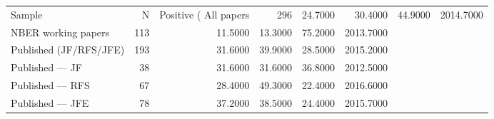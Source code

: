 \begin{tabular}{lrrrrr}
\toprule
Sample & N & Positive (%
\midrule
All papers & 296 & 24.7000 & 30.4000 & 44.9000 & 2014.7000 \\
NBER working papers & 113 & 11.5000 & 13.3000 & 75.2000 & 2013.7000 \\
Published (JF/RFS/JFE) & 193 & 31.6000 & 39.9000 & 28.5000 & 2015.2000 \\
Published — JF & 38 & 31.6000 & 31.6000 & 36.8000 & 2012.5000 \\
Published — RFS & 67 & 28.4000 & 49.3000 & 22.4000 & 2016.6000 \\
Published — JFE & 78 & 37.2000 & 38.5000 & 24.4000 & 2015.7000 \\
\bottomrule
\end{tabular}
